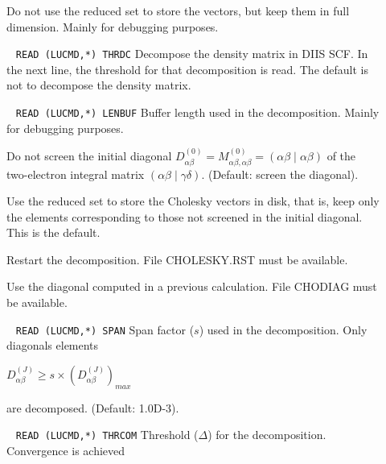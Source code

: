 \begin{description}
%
\item[] 
        Do not use the reduced set to store the vectors, but keep them in
        full dimension. Mainly for debugging purposes.
%
\item[] \verb| |\newline
\verb|READ (LUCMD,*) THRDC|\newline
        Decompose the density matrix in DIIS SCF. In the next line, the
        threshold for that decomposition is read. The default is not to
        decompose the density matrix.
%
\item[] \verb| |\newline
\verb|READ (LUCMD,*) LENBUF|\newline
        Buffer length used in the decomposition. Mainly for debugging purposes.
%
\item[] 
        Do not screen  the initial diagonal 
        $D^{(0)}_{\alpha \beta}=
         M^{(0)}_{\alpha \beta,\alpha \beta}=(\alpha \beta \mid \alpha \beta)$
        of the two-electron integral matrix $(\alpha \beta \mid \gamma \delta)$.
        (Default: screen the diagonal).
%
\item[] 
        Use the reduced set to store the Cholesky vectors in disk, that is, keep
        only the elements corresponding to those not screened in the initial
        diagonal. This is the default.
%
\item[]
        Restart the decomposition. File CHOLESKY.RST must be available.
%
\item[]
        Use the diagonal computed in a previous calculation. File CHODIAG
        must be available.
%
\item[] \verb| |\newline
\verb|READ (LUCMD,*) SPAN|\newline
        Span factor ($s$) used in the decomposition. Only diagonals elements 
        \newline 
        \begin{center}
        $D^{(J)}_{\alpha \beta} \geq s \times (D^{(J)}_{\alpha \beta})_{max}$
        \end{center}
        are decomposed. (Default: 1.0D-3).
%
\item[] \verb| |\newline
\verb|READ (LUCMD,*) THRCOM|\newline
        Threshold ($\Delta$) for the decomposition. Convergence is achieved 

\end{description}
